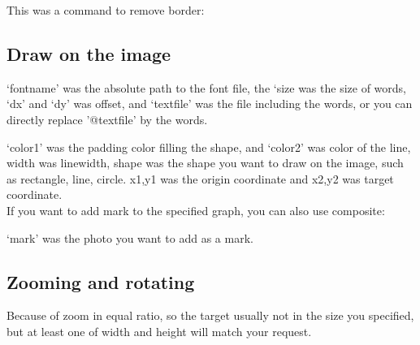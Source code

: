 \documentclass[12pt]{article}
\begin{document}
This was a command to remove border:\\

{\centering{}\par}

\subsection{Draw on the image}
{\centering{}\par}\vspace{5mm}

`fontname' was the absolute path to the font file, the `size was the size of words, `dx' and `dy' was offset, and `textfile' was the file including the words, or you can directly replace '@textfile' by the words.\vspace{5mm}

{\centering{}\par}\vspace{5mm}

`color1' was the padding color filling the shape, and `color2' was color of the line, width was linewidth, shape was the shape you want to draw on the image, such as rectangle, line, circle. x1,y1 was the origin coordinate and x2,y2 was target coordinate.\\

If you want to add mark to the specified graph, you can also use composite:\vspace{5mm}

{\centering{}\par}\vspace{5mm}

`mark' was the photo you want to add as a mark.

\subsection{Zooming and rotating}
{\centering{}\par}\vspace{5mm}

Because of zoom in equal ratio, so the target usually not in the size you specified, but at least one of width and height will match your request.
\end{document}
